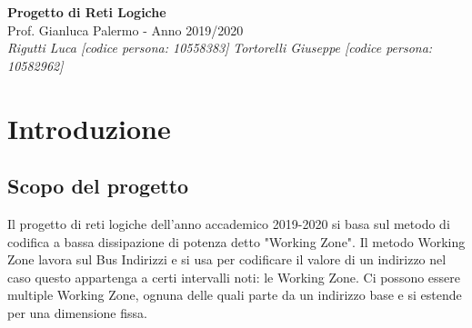 \documentclass{article}
\begin{document}
\begin{titlepage}
   \begin{center}
      \Huge\textbf{Progetto di Reti Logiche}\\
      \vspace{5mm} %
      \Large Prof. Gianluca Palermo - Anno 2019/2020\\
      \vspace{5mm} %
      \large\textit{Rigutti Luca [codice persona: 10558383]}
      \linebreak
      \large\textit{Tortorelli Giuseppe [codice persona: 10582962]}
   \end{center}
\end{titlepage}
\printindex

\tableofcontents
\pagebreak

\section{Introduzione}
\subsection{Scopo del progetto}
Il progetto di reti logiche dell'anno accademico 2019-2020 si basa sul metodo di codifica a bassa dissipazione di potenza detto "Working Zone".
Il metodo Working Zone lavora sul Bus Indirizzi e si usa per codificare il valore di un indirizzo nel caso questo appartenga a certi intervalli noti: le Working Zone. Ci possono essere multiple Working Zone, ognuna delle quali parte da un indirizzo base e si estende per una dimensione fissa.
\end{document}
